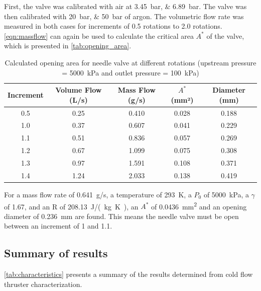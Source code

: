            First, the valve was calibrated with air at \qtylist{3.45;6.89}{bar}. The valve was then calibrated with \qtylist{20;50}{bar} of argon. The volumetric flow rate was measured in both cases for increments of 0.5 rotations to 2.0 rotations. \autoref{eqn:massflow} can again be used to calculate the critical area $A^*$ of the valve, which is presented in \autoref{tab:opening_area}.

            \begin{table}[!ht]
                \centering
                \caption{Calculated opening area for needle valve at different rotations (upstream pressure = \qty{5000}{kPa} and outlet pressure = \qty{100}{kPa})}
                \label{tab:opening_area}
                \begin{tabular}{ccccc}
                \toprule
                Increment & Volume Flow (L/s) & Mass Flow (g/s) & $A^*$ (mm²) & Diameter (mm) \\ \midrule
                0.5 & 0.25 & 0.410 & 0.028 & 0.188 \\
                1.0 & 0.37 & 0.607 & 0.041 & 0.229 \\
                1.1 & 0.51 & 0.836 & 0.057 & 0.269 \\
                1.2 & 0.67 & 1.099 & 0.075 & 0.308 \\
                1.3 & 0.97 & 1.591 & 0.108 & 0.371 \\
                1.4 & 1.24 & 2.033 & 0.138 & 0.419 \\
                \bottomrule
                \end{tabular}
            \end{table}

            For a mass flow rate of \qty{0.641}{g/s}, a temperature of \qty{293}{K}, a $P_0$ of \qty{5000}{kPa}, a $\gamma$ of 1.67, and an R of \qty{208.13}{J/(kg.K)}, an $A^*$ of \qty{0.0436}{mm^2} and an opening diameter of \qty{0.236}{mm} are found. This means the needle valve must be open between an increment of 1 and 1.1.

        \subsection{Summary of results}

            \autoref{tab:characteristics} presents a summary of the results determined from cold flow thruster characterization.

